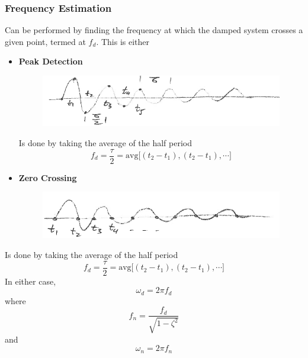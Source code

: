 \documentclass[12pt,letter]{article}
\begin{document}
\subsubsection{Frequency Estimation} Can be performed by finding the frequency at which the damped system crosses a given point, termed at $f_d$. This is either
\begin{itemize}
\item \textbf{Peak Detection} 
			\begin{figure}[H]
				\centering
				\includegraphics[width=5in]{../figures/peak_detection.png}
			\end{figure}	
Is done by taking the average of the half period
\begin{equation}
f_d = \frac{\tau}{2} = \text{avg}\big[ (t_2-t_1), (t_2-t_1), \cdots \big]
\end{equation}
\item \textbf{Zero Crossing} 
			\begin{figure}[H]
				\centering
				\includegraphics[width=5in]{../figures/zero_crossing.png}
			\end{figure}
\end{itemize}	
Is done by taking the average of the half period
\begin{equation}
f_d = \frac{\tau}{2} = \text{avg}\big[ (t_2-t_1), (t_2-t_1), \cdots \big]
\end{equation}
In either case, 
\begin{equation}
\omega_d = 2 \pi f_d
\end{equation}
where 
\begin{equation}
f_n = \frac{f_d}{\sqrt{1-\zeta^2}}
\end{equation}
and
\begin{equation}
\omega_n = 2 \pi f_n
\end{equation}
\end{document}
